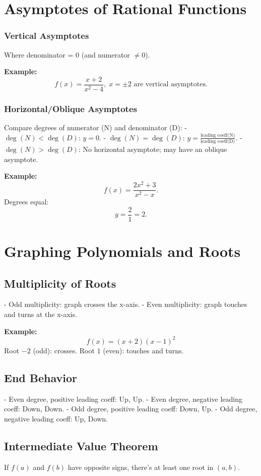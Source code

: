 \documentclass{article}
\begin{document}
\begin{multicols}{2}
\section*{Asymptotes of Rational Functions}

\subsubsection*{Vertical Asymptotes}
Where denominator = 0 (and numerator \(\neq0\)).

\textbf{Example:}
\[
f(x)=\frac{x+2}{x^2-4}, \; x=\pm2 \text{ are vertical asymptotes.}
\]

\subsubsection*{Horizontal/Oblique Asymptotes}
Compare degrees of numerator (N) and denominator (D):
- \(\deg(N)<\deg(D)\): \(y=0\).
- \(\deg(N)=\deg(D)\): \(y=\frac{\text{leading coeff(N)}}{\text{leading coeff(D)}}\).
- \(\deg(N)>\deg(D)\): No horizontal asymptote; may have an oblique asymptote.

\textbf{Example:}
\[
f(x)=\frac{2x^2+3}{x^2-x}.
\]
Degrees equal:
\[
y=\frac{2}{1}=2.
\]

\section*{Graphing Polynomials and Roots}

\subsection*{Multiplicity of Roots}
- Odd multiplicity: graph crosses the x-axis.
- Even multiplicity: graph touches and turns at the x-axis.

\textbf{Example:}
\[
f(x)=(x+2)(x-1)^2
\]
Root \(-2\) (odd): crosses.  
Root \(1\) (even): touches and turns.

\subsection*{End Behavior}
- Even degree, positive leading coeff: Up, Up.
- Even degree, negative leading coeff: Down, Down.
- Odd degree, positive leading coeff: Down, Up.
- Odd degree, negative leading coeff: Up, Down.

\subsection*{Intermediate Value Theorem}
If \(f(a)\) and \(f(b)\) have opposite signs, there's at least one root in \((a,b)\).


\end{multicols}
\end{document}
